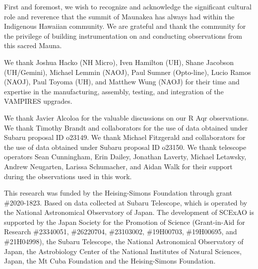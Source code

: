 \begin{acknowledgements}

First and foremost, we wish to recognize and acknowledge the significant cultural role and reverence that the summit of Maunakea has always had within the Indigenous Hawaiian community. We are grateful and thank the community for the privilege of building instrumentation on and conducting observations from this sacred Mauna.

We thank Joshua Hacko (NH Micro), Iven Hamilton (UH), Shane Jacobson (UH/Gemini), Michael Lemmin (NAOJ), Paul Sumner (Opto-line), Lucio Ramos (NAOJ), Paul Toyoma (UH), and Matthew Wung (NAOJ) for their time and expertise in the manufacturing, assembly, testing, and integration of the VAMPIRES upgrades.

We thank Javier Alcoloa for the valuable discussions on our R Aqr observations. We thank Timothy Brandt and collaborators for the use of data obtained under Subaru proposal ID o23149. We thank Michael Fitzgerald and collaborators for the use of data obtained under Subaru proposal ID o23150. We thank telescope operators Sean Cunningham, Erin Dailey, Jonathan Laverty, Michael Letawsky, Andrew Neugarten, Larissa Schumacher, and Aidan Walk for their support during the observations used in this work.

This research was funded by the Heising-Simons Foundation through grant \#2020-1823. Based on data collected at Subaru Telescope, which is operated by the National Astronomical Observatory of Japan. The development of SCExAO is supported by the Japan Society for the Promotion of Science (Grant-in-Aid for Research \#23340051, \#26220704, \#23103002, \#19H00703, \#19H00695, and \#21H04998), the Subaru Telescope, the National Astronomical Observatory of Japan, the Astrobiology Center of the National Institutes of Natural Sciences, Japan, the Mt Cuba Foundation and the Heising-Simons Foundation.
\end{acknowledgements}